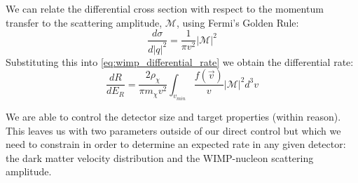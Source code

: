 \par 
We can relate the differential cross section with respect to the momentum transfer to the scattering amplitude, $\mathcal{M}$, using Fermi's Golden Rule:
\begin{equation}
    \frac{d\sigma}{d|q|^2} = \frac{1}{\pi v^2} |\mathcal{M}|^2
    \label{eq:fermi_golden_rule_for_cross_section}
\end{equation}
Substituting this into \autoref{eq:wimp_differential_rate} we obtain the differential rate: 
\begin{equation}
    \frac{dR}{dE_R} = \frac{2\rho_{\chi}}{\pi m_{\chi} v^2} \int_{v_{min}} \frac{f(\vec{v})}{v} | \mathcal{M} |^2 d^3v
    \label{eq:wimp_differential_rate_scattering_amplitude}
\end{equation}
\par
We are able to control the detector size and target properties (within reason).
This leaves us with two parameters outside of our direct control but which we need to constrain in order to determine an expected rate in any given detector: the dark matter velocity distribution and the WIMP-nucleon scattering amplitude.

